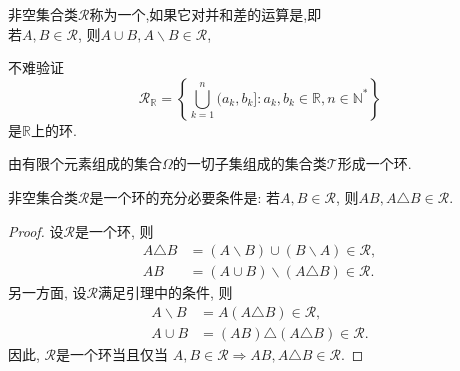 \begin{definition}[环]
	非空集合类$\mathscr{R}$称为一个,如果它对并和差的运算是,即\\
	若$A,B\in\mathscr{R}$, 则$A\cup B,A\backslash B\in\mathscr{R}$,
\end{definition}
\begin{example}
	不难验证\begin{equation}
	\mathscr{R}_\mathbb{R} = \left\{ \bigcup_{k=1}^n(a_k,b_k]:a_k,b_k\in\mathbb{R},n\in\mathbb{N}^*  \right\}
	\end{equation}
	是$\mathbb{R}$上的环.
\end{example}
\begin{example}
	由有限个元素组成的集合$\Omega$的一切子集组成的集合类$\mathscr{T}$形成一个环.
\end{example}
\begin{lemma}
	非空集合类$\mathscr{R}$是一个环的充分必要条件是:
	若$A,B\in\mathscr{R}$, 则$AB,A\triangle B\in\mathscr{R}$.
\end{lemma}
\begin{proof}
	设$\mathscr{R}$是一个环, 则\begin{align}
	A\triangle B &= (A\backslash B)\cup (B\backslash A)\in\mathscr{R},\nonumber\\
	AB &= (A\cup B)\backslash(A\triangle B)\in\mathscr{R}.
	\end{align}
	另一方面, 设$\mathscr{R}$满足引理中的条件, 则\begin{align}
	A\backslash B &= A(A\triangle B)\in\mathscr{R},\nonumber\\
	A\cup B &= (AB)\triangle(A\triangle B)\in\mathscr{R}.
	\end{align}
	因此, $\mathscr{R}$是一个环当且仅当 $A,B\in\mathscr{R}\Rightarrow AB,A\triangle B\in\mathscr{R}$.
\end{proof}


